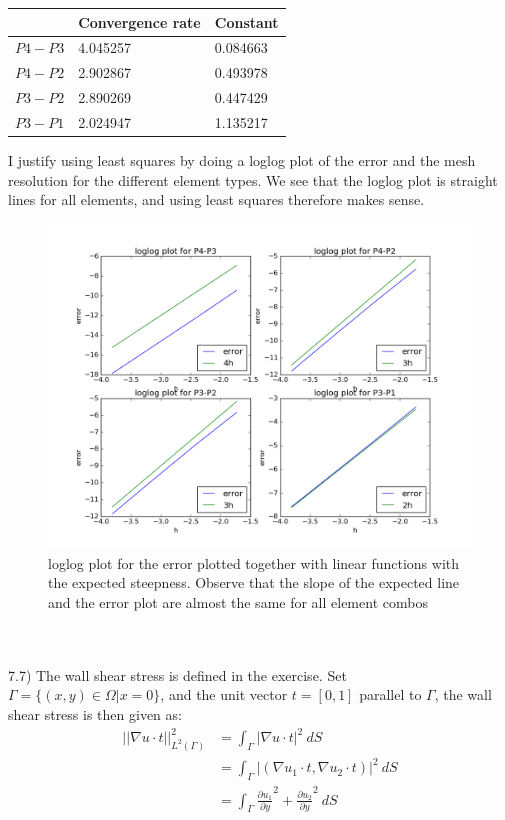 \documentclass[11pt,a4paper]{report}
\begin{document}
\begin{center}
    \begin{tabular}{| l | l | l |}
    \hline
     & Convergence rate & Constant  \\ \hline
    $P4-P3$ & 4.045257 & 0.084663 \\ \hline
    $P4-P2$ & 2.902867 &  0.493978	\\ \hline
    $P3-P2$ & 2.890269 & 0.447429\\ \hline
    $P3-P1$ & 2.024947 &  1.135217	\\ \hline
    \end{tabular}
\end{center}
I justify using least squares by doing a loglog plot of the error and the mesh resolution for the different element types. We see that the loglog plot is straight lines for all elements, and using least squares therefore makes sense.
\begin{figure}
  \includegraphics[width=\linewidth]{element_con.png}
  \caption{loglog plot for the error plotted together with linear functions with the expected steepness. Observe that the slope of the expected line and the error plot are almost the same for all element combos}
  \label{Fig 1}
\end{figure}
\\
\\
7.7) The wall shear stress is defined in the exercise. Set \\$\Gamma = \{(x,y) \in \Omega | x=0 \}$, and the unit vector $t=[0,1]$ parallel to $\Gamma$, the wall shear stress is then given as: 
\begin{align*}
||\nabla u\cdot t||_{L^2(\Gamma)}^2 &= \int_{\Gamma} |\nabla u \cdot t|^2  \ dS \\
&=  \int_{\Gamma} |(\nabla u_1 \cdot t,\nabla u_2 \cdot t)|^2  \ dS \\
&=\int_{\Gamma} \frac{\partial u_1}{\partial y}^2 + \frac{\partial u_2}{\partial y}^2 \ dS
\end{align*} 
\end{document}
